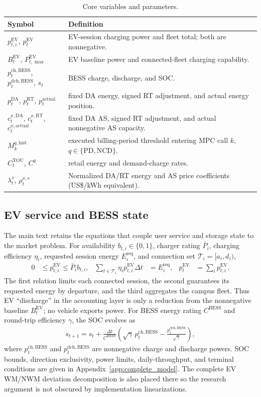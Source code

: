 \documentclass[final,5p,times]{elsarticle}
\newcommand{\dt}{\Delta t}
\newcommand{\EV}{\mathrm{EV}}
\newcommand{\BESS}{\mathrm{BESS}}
\newcommand{\DA}{\mathrm{DA}}
\newcommand{\RT}{\mathrm{RT}}
\newcommand{\TOU}{\mathrm{TOU}}
\newcommand{\PD}{\mathrm{PD}}
\newcommand{\NCD}{\mathrm{NCD}}
\newcommand{\ch}{\mathrm{ch}}
\newcommand{\dch}{\mathrm{dch}}
\newcommand{\actual}{\mathrm{actual}}
\newcommand{\hist}{\mathrm{hist}}
\newcommand{\req}{\mathrm{req}}
\newcommand{\calT}{\mathcal{T}}
\begin{document}
\begin{table}[!t]
\centering
\caption{Core variables and parameters.}
\label{tab:notation}
\scriptsize
\begin{tabularx}{\textwidth}{@{}p{}X@{}}
\toprule
Symbol & Definition \\
\midrule
$p_{t,i}^{\EV}$, $p_t^{\EV}$ & EV-session charging power and fleet total; both are nonnegative.\\
$B_t^{\EV}$, $P_{t,\max}^{\EV}$ & EV baseline power and connected-fleet charging capability.\\
$p_t^{\ch,\BESS}$, $p_t^{\dch,\BESS}$, $s_t$ & BESS charge, discharge, and SOC.\\
$p_t^{\DA}$, $p_t^{\RT}$, $p_t^{\actual}$ & fixed DA energy, signed RT adjustment, and actual energy position.\\
$c_t^{x,\DA}$, $c_t^{x,\RT}$, $c_t^{x,\actual}$ & fixed DA AS, signed RT adjustment, and actual nonnegative AS capacity.\\
$M_k^{q,\hist}$ & executed billing-period threshold entering MPC call $k$, $q\in\{\PD,\NCD\}$.\\
$C_t^{\TOU}$, $C^q$ & retail energy and demand-charge rates.\\
$\lambda_t^s$, $\rho_t^{x,s}$ & Normalized DA/RT energy and AS price coefficients (US\$/kWh equivalent).\\
\bottomrule
\end{tabularx}
\end{table}

\subsection{EV service and BESS state}
The main text retains the equations that couple user service and storage state
to the market problem. For availability $b_{t,i}\in\{0,1\}$, charger rating
$\bar P_i$, charging efficiency $\eta_i$, requested session energy
$E_i^{\req}$, and connection set $\calT_i=[a_i,d_i)$,
\begin{align}
0&\le p_{t,i}^{\EV}\le \bar P_i b_{t,i},
&\sum_{t\in\calT_i}\eta_i p_{t,i}^{\EV}\dt&=E_i^{\req},
&p_t^{\EV}&=\sum_i p_{t,i}^{\EV}. \label{eq:ev_core}
\end{align}
The first relation limits each connected session, the second guarantees its
requested energy by departure, and the third aggregates the campus fleet. Thus
EV ``discharge'' in the accounting layer is only a reduction from the
nonnegative baseline $B_t^{\EV}$; no vehicle exports power. For BESS energy
rating $C^{\BESS}$ and round-trip efficiency $\gamma$, the SOC evolves as
\begin{align}
s_{t+1}=s_t+\frac{\dt}{C^{\BESS}}
\left(\sqrt{\gamma}\,p_t^{\ch,\BESS}
-\frac{p_t^{\dch,\BESS}}{\sqrt{\gamma}}\right), \label{eq:soc}
\end{align}
where $p_t^{\ch,\BESS}$ and $p_t^{\dch,\BESS}$ are nonnegative charge and
discharge powers. SOC bounds, direction exclusivity, power limits,
daily-throughput, and terminal conditions are given in
Appendix~\ref{app:complete_model}. The complete EV
WM/NWM deviation decomposition is also placed there so the research argument
is not obscured by implementation linearizations.
\end{document}
